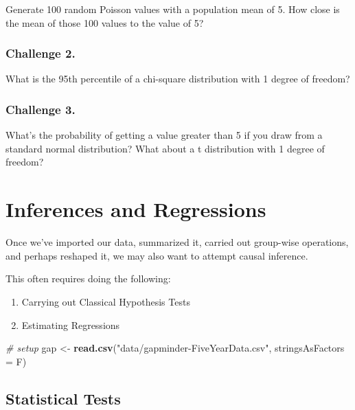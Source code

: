 \documentclass[]{book}
\newenvironment{Shaded}{\begin{snugshade}}{\end{snugshade}}
\newcommand{\KeywordTok}[1]{\textcolor[rgb]{0.13,0.29,0.53}{\textbf{#1}}}
\newcommand{\DataTypeTok}[1]{\textcolor[rgb]{0.13,0.29,0.53}{#1}}
\newcommand{\StringTok}[1]{\textcolor[rgb]{0.31,0.60,0.02}{#1}}
\newcommand{\CommentTok}[1]{\textcolor[rgb]{0.56,0.35,0.01}{\textit{#1}}}
\newcommand{\NormalTok}[1]{#1}
\providecommand{\tightlist}{%
  \setlength{\itemsep}{0pt}\setlength{\parskip}{0pt}}
\begin{document}
Generate 100 random Poisson values with a population mean of 5. How
close is the mean of those 100 values to the value of 5?

\subsubsection*{Challenge 2.}\label{challenge-2.-9}

What is the 95th percentile of a chi-square distribution with 1 degree
of freedom?

\subsubsection*{Challenge 3.}\label{challenge-3.-6}

What's the probability of getting a value greater than 5 if you draw
from a standard normal distribution? What about a t distribution with 1
degree of freedom?

\section{Inferences and Regressions}\label{inferences-and-regressions}

Once we've imported our data, summarized it, carried out group-wise
operations, and perhaps reshaped it, we may also want to attempt causal
inference.

This often requires doing the following:

\begin{enumerate}
\def\labelenumi{\arabic{enumi})}
\tightlist
\item
  Carrying out Classical Hypothesis Tests
\item
  Estimating Regressions
\end{enumerate}

\begin{Shaded}
\begin{Highlighting}[]
\CommentTok{# setup}
\NormalTok{gap <-}\StringTok{ }\KeywordTok{read.csv}\NormalTok{(}\StringTok{"data/gapminder-FiveYearData.csv"}\NormalTok{, }\DataTypeTok{stringsAsFactors =}\NormalTok{ F)}
\end{Highlighting}
\end{Shaded}

\subsection{Statistical Tests}\label{statistical-tests}
\end{document}
